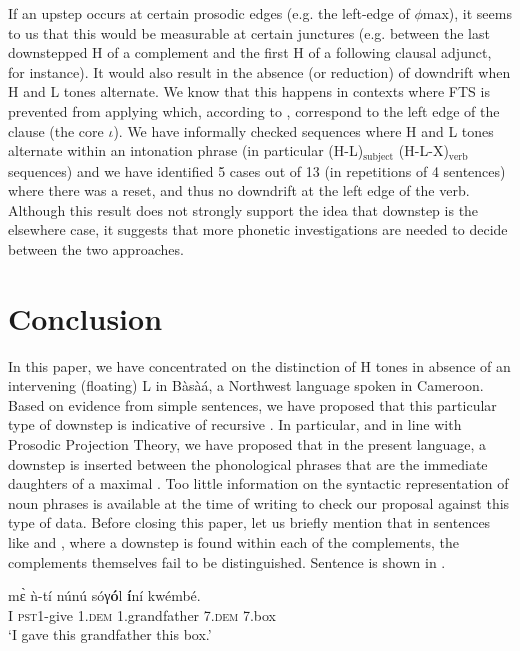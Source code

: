 \documentclass[output=paper,newtxmath,modfonts,nonflat]{langsci/langscibook}
\begin{document}
If an upstep occurs at certain prosodic edges (e.g. the left-edge of $\phi$max), it seems to us that this would be measurable at certain junctures (e.g. between the last downstepped H of a complement and the first H of a following clausal adjunct, for instance). It would also result in the absence (or reduction) of downdrift when H and L tones alternate. We know that this happens in  contexts where FTS is prevented from applying which, according to \citet{HamlaouiSzendroi16}, correspond to the left edge of the clause (the core $\iota$). We have informally checked sequences where H and L tones alternate within an intonation phrase (in particular (H-L)$_{\text{subject}}$ (H-L-X)$_{\text{verb}}$ sequences) and we have identified 5 cases out of 13 (in repetitions of 4 sentences) where there was a reset, and thus no downdrift at the left edge of the verb. Although this result does not strongly support the idea that downstep is the elsewhere case, it suggests that more phonetic investigations are needed to decide between the two approaches.

 
\section{Conclusion}\label{sec:HamlaouiMakasso:5} 

In this paper, we have concentrated on the distinction of  H tones in absence of an intervening (floating) L  in Bàsà{á}, a Northwest  language spoken in Cameroon. Based on evidence from simple sentences, we have proposed that this particular type of downstep is indicative of recursive . In particular, and in line with  Prosodic Projection Theory, we have proposed that in the present language, a downstep is inserted between the phonological phrases that are the immediate daughters of a maximal . Too little information on the syntactic representation of noun phrases is available at the time of writing to check our proposal against this type of data. 
Before closing this paper, let us briefly mention that in sentences like  and , where a downstep is found within each of the complements, the complements themselves fail to be distinguished. Sentence  is shown in . 

\ea \gll m\`ɛ ǹ-tí núnú {\textdownstep}sóγ\textbf{ó}l \textbf{í}ní {\textdownstep}kwémbé.\\
I \textsc{pst1}-give 1.\textsc{dem} 1.grandfather 7.\textsc{dem} 7.box\\
\glt `I gave this grandfather this box.'\label{ex:HamlaouiMakasso:27}
\z
\end{document}
